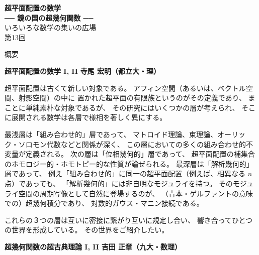 \documentclass[uplatex,dvipdfmx]{jlreq}
\begin{document}
\begin{center}
  \vspace*{20pt}
  {\Huge\bfseries 超平面配置の数学}\\[10pt]
  {\Large\bfseries ── 鏡の国の超幾何関数 ──}\\[30pt]
  {\large いろいろな数学の集いの広場}\\[20pt]
  {\large 第13回}
\end{center}

\vspace{20pt}

\begin{center}
  {\large 概要}
\end{center}

\vfill

\newpage

\noindent
{\large\bfseries 超平面配置の数学 I, II}
\hfill
{\large\bfseries 寺尾 宏明（都立大・理）}

\medskip

超平面配置は古くて新しい対象である。
アフィン空間（あるいは、ベクトル空間、射影空間）の中に
置かれた超平面の有限族というのがその定義であり、
まことに単純素朴な対象であるが、
その研究にはいくつかの層が考えられ、
そこに展開される数学は各層で様相を著しく異にする。

最浅層は「組み合わせ的」層であって、
マトロイド理論、束理論、オーリック・ソロモン代数などと関係が深く、
この層においての多くの組み合わせ的不変量が定義される。
次の層は「位相幾何的」層であって、
超平面配置の補集合のホモロジー的・ホモトピー的な性質が論ぜられる。
最深層は「解析幾何的」層であって、
例え「組み合わせ的」に同一の超平面配置（例えば、相異なる $n$ 点）であっても、
「解析幾何的」には非自明なモジュライを持つ。
そのモジュライ空間の周期写像として自然に登場するのが、
（青本・ゲルファントの意味での）超幾何積分であり、
対数的ガウス・マニン接続である。

これらの３つの層は互いに密接に繋がり互いに規定し合い、
響き合ってひとつの世界を形成している。
その世界をご紹介したい。

\newpage

\noindent
{\large\bfseries 超幾何関数の超古典理論 I, II}
\hfill
{\large\bfseries 吉田 正章（九大・数理）}
\end{document}
